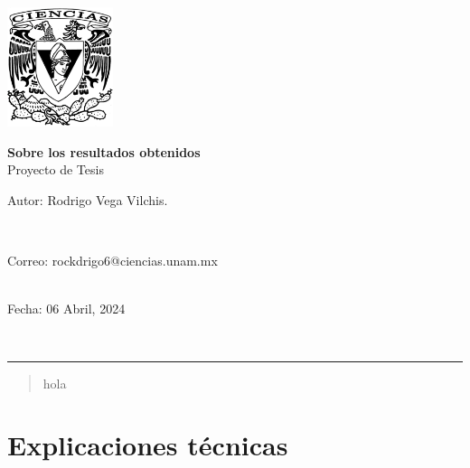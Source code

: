 \documentclass[11pt,a4paper]{article}
\begin{document}
\thispagestyle{empty}
\includegraphics[height=3.5cm]{escudoCiencias.pdf}
\vspace{-3.8cm}
\begin{flushright}
	\hspace{4cm}
	{\Large\textbf{Sobre los resultados obtenidos}\\
		Proyecto de Tesis}
	\vspace{0.3cm}\\
	\begin{large}Autor: Rodrigo Vega Vilchis.\end{large}\\
	\begin{footnotesize}
		Correo: rockdrigo6@ciencias.unam.mx\\
		\\
	\end{footnotesize}
	\vspace{0.1cm}
	\begin{large}
		Fecha: 06 Abril, 2024\end{large}\\
\end{flushright}
\hrule height1pt\vspace{.5cm}

\begin{abstract}
	hola
\end{abstract} 
	
\section{Explicaciones técnicas}
\end{document}
